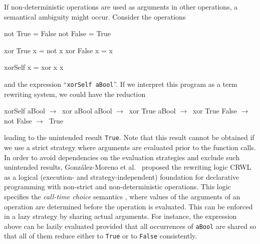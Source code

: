 \documentclass{llncs}
\newcommand{\code}[1]{\mbox{\small\texttt{#1}}}
\newcommand{\ccode}[1]{``\code{#1}''}
\begin{document}
If non-deterministic operations are used as arguments in other operations,
a semantical ambiguity might occur. Consider the operations
%
\begin{curry}
  not True  = False
  not False = True

  xor True  x = not x
  xor False x = x

  xorSelf x = xor x x
\end{curry}
%
and the expression \ccode{xorSelf aBool}.
If we interpret this program as a term rewriting system,
we could have the reduction
\begin{haskell}
  xorSelf aBool  $\to~$  xor aBool aBool     $\to~$  xor True aBool
                 $\to~$  xor True False      $\to~$  not False        $\to~$ True
\end{haskell}
leading to the unintended result \code{True}.
Note that this result cannot be obtained if we use a strict strategy
where arguments are evaluated prior to the function calls.
In order to avoid dependencies on the evaluation strategies
and exclude such unintended results,
Gonz\'alez-Moreno et al.\ \cite{GonzalezEtAl99} proposed
the rewriting logic CRWL as a logical
(execution- and strategy-independent) foundation for declarative
programming with non-strict and non-deterministic operations.  This
logic specifies the \emph{call-time choice} semantics \cite{Hussmann92}
\label{ctc-semantics},
where values of the arguments of an operation are determined before the
operation is evaluated. This can be enforced in a lazy strategy
by sharing actual arguments.
For instance, the expression above can be lazily evaluated
provided that all occurrences of \code{aBool}
are shared so that all of them reduce either to \code{True} or to \code{False}
consistently.
\end{document}
